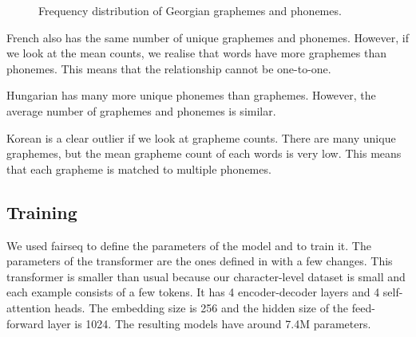 \documentclass[11pt,a4paper]{article}
\begin{document}
\begin{figure}
    \centering
    \caption{Frequency distribution of Georgian graphemes and phonemes.}
    \label{fig:geo_graphemes_phonemes}
\end{figure}

French also has the same number of unique graphemes and phonemes. However, if we look at the mean counts, we realise that words have more graphemes than phonemes. This means that the relationship cannot be one-to-one.

Hungarian has many more unique phonemes than graphemes. However, the average number of graphemes and phonemes is similar.

Korean is a clear outlier if we look at grapheme counts. There are many unique graphemes, but the mean grapheme count of each words is very low. This means that each grapheme is matched to multiple phonemes.

\subsection{Training}

We used fairseq to define the parameters of the model and to train it. The parameters of the transformer are the ones defined in \citet{wu2021applying} with a few changes. This transformer is smaller than usual because our character-level dataset is small and each example consists of a few tokens. It has 4 encoder-decoder layers and 4 self-attention heads. The embedding size is 256 and the hidden size of the feed-forward layer is 1024. The resulting models have around 7.4M parameters.
\end{document}
